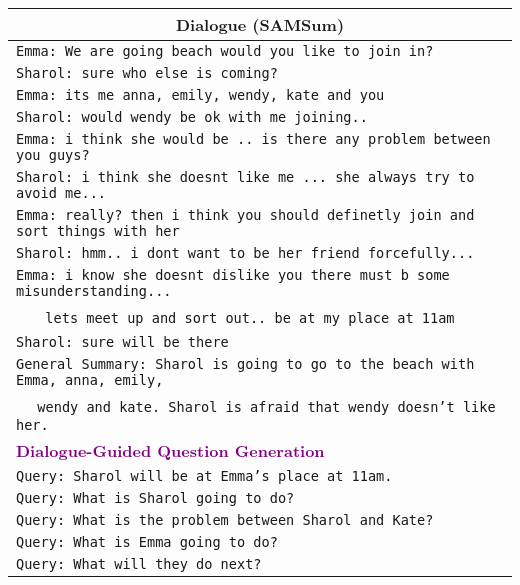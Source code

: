 \documentclass[11pt]{article}
\begin{document}
\begin{table*}[t]
        \centering
        \begin{adjustbox}{width=1.00\textwidth,center}
        \begin{tabular}{ | l |}
        \toprule
        \multicolumn{1}{|c|}{\textbf{Dialogue (SAMSum)}} \\ 
        \hline
        \texttt{Emma: We are going beach would you like to join in?} \\
        \texttt{Sharol: sure who else is coming?} \\
        \texttt{Emma: its me anna, emily, wendy, kate and you} \\
        \texttt{Sharol: would wendy be ok with me joining..} \\
        \texttt{Emma: i think she would be .. is there any problem between you guys?} \\
        \texttt{Sharol: i think she doesnt like me ... she always try to avoid me...} \\
        \texttt{Emma: really? then i think you should definetly join and sort things with her} \\
        \texttt{Sharol: hmm.. i dont want to be her friend forcefully...} \\
        \texttt{Emma: i know she doesnt dislike you there must b some misunderstanding...} \\ 
        \quad\quad~~~ \texttt{lets meet up and sort out.. be at my place at 11am} \\
        \texttt{Sharol: sure will be there} \\ \hline
        \texttt{General Summary: Sharol is going to go to the beach with Emma, anna, emily,} \\
        \quad\quad\quad\quad\quad\quad\quad\quad~~ \texttt{wendy and kate. Sharol is afraid that wendy doesn't like her. } \\

        \hline \hline
        \textbf{\textcolor{purple}{Dialogue-Guided Question Generation}}\\ 
        \hline
        \texttt{Query: Sharol will be at Emma's place at 11am.} \\
        \texttt{Query: What is Sharol going to do? } \\
        \texttt{Query: What is the problem between Sharol and Kate? } \\
        \texttt{Query: What is Emma going to do? } \\
        \texttt{Query: What will they do next? } \\


\end{tabular}
\end{adjustbox}
\end{table*}
\end{document}
